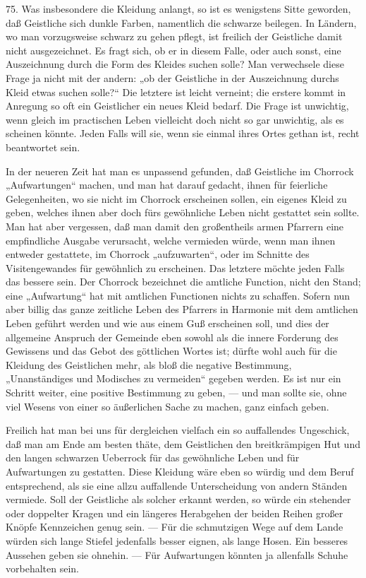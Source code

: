 75. Was insbesondere die Kleidung anlangt, so ist es wenigstens Sitte geworden, daß Geistliche sich dunkle Farben, namentlich die schwarze beilegen. In Ländern, wo man vorzugsweise schwarz zu gehen pflegt, ist freilich der Geistliche damit nicht ausgezeichnet. Es fragt sich, ob er in diesem Falle, oder auch sonst, eine Auszeichnung durch die Form des Kleides suchen solle? Man verwechsele diese Frage ja nicht mit der andern: „ob der Geistliche in der Auszeichnung durchs Kleid etwas suchen solle?“ Die letztere ist leicht verneint; die erstere kommt in Anregung
so oft ein Geistlicher ein neues Kleid bedarf. Die Frage ist unwichtig, wenn gleich im practischen Leben vielleicht doch nicht so gar unwichtig, als es scheinen könnte. Jeden Falls will sie, wenn sie einmal ihres Ortes gethan ist, recht beantwortet sein.

In der neueren Zeit hat man es unpassend gefunden, daß Geistliche im Chorrock „Aufwartungen“ machen, und man hat darauf gedacht, ihnen für feierliche Gelegenheiten, wo sie nicht im Chorrock erscheinen sollen, ein eigenes Kleid zu geben, welches ihnen aber doch fürs gewöhnliche Leben nicht gestattet sein sollte. Man hat aber vergessen, daß man damit den großentheils armen Pfarrern eine empfindliche Ausgabe verursacht, welche vermieden würde, wenn man ihnen entweder gestattete, im Chorrock „aufzuwarten“, oder im Schnitte des Visitengewandes für gewöhnlich zu erscheinen. Das letztere möchte jeden Falls das bessere sein. Der Chorrock bezeichnet die amtliche Function, nicht den Stand; eine „Aufwartung“ hat mit amtlichen Functionen nichts zu schaffen. Sofern nun aber billig das ganze zeitliche Leben des Pfarrers in Harmonie mit dem amtlichen Leben geführt werden und wie aus einem Guß erscheinen soll, und dies der allgemeine Anspruch der Gemeinde eben sowohl als die innere Forderung des Gewissens und das Gebot des göttlichen Wortes ist; dürfte wohl auch für die Kleidung des Geistlichen mehr, als bloß die negative Bestimmung, „Unanständiges und Modisches zu vermeiden“ gegeben werden. Es ist nur ein Schritt weiter, eine positive Bestimmung zu geben, — und man sollte sie, ohne viel Wesens
von einer so äußerlichen Sache zu machen, ganz einfach geben.

Freilich hat man bei uns für dergleichen vielfach ein so auffallendes Ungeschick, daß man am Ende am besten thäte, dem Geistlichen den breitkrämpigen Hut und den langen schwarzen Ueberrock für das gewöhnliche Leben und für Aufwartungen zu gestatten. Diese Kleidung wäre eben so würdig und dem Beruf entsprechend, als sie eine allzu auffallende Unterscheidung von andern Ständen vermiede. Soll der Geistliche als solcher erkannt werden, so würde ein stehender oder doppelter Kragen und ein längeres Herabgehen der beiden Reihen großer Knöpfe Kennzeichen genug sein. — Für die schmutzigen Wege auf dem Lande würden sich lange Stiefel jedenfalls besser eignen, als lange Hosen. Ein besseres Aussehen geben sie ohnehin. — Für Aufwartungen könnten ja allenfalls Schuhe vorbehalten sein.

